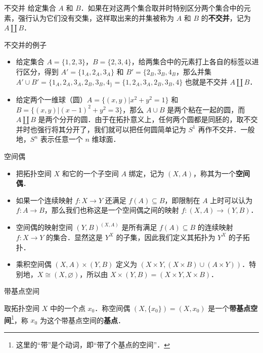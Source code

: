 

\begin{definition}{不交并}
给定集合 $A$ 和 $B$．如果在对这两个集合取并时特别区分两个集合中的元素，强行认为它们没有交集，这样取出来的并集被称为 $A$ 和 $B$ 的\textbf{不交并}，记为 $A\amalg B$．
\end{definition}

\begin{example}{不交并的例子}
\begin{itemize}
\item 给定集合 $A=\{1,2,3\}$，$B=\{2,3,4\}$，给两集合中的元素打上各自的标签以进行区分，得到 $A'=\{1_A, 2_A, 3_A\}$ 和 $B'=\{2_B, 3_B, 4_B$，那么并集 $A'\cup B'=\{1_A, 2_A, 3_A, 2_B, 3_B, 4_\}=\{1, 2_A, 3_A, 2_B, 3_B, 4\}$ 也就是不交并 $A\amalg B$．
\item 给定两个一维球（圆）$A=\{(x, y)|x^2+y^2=1\}$ 和 $B=\{(x, y)|(x-1)^2+y^2=3\}$，那么 $A\cup B$ 是两个粘在一起的圆，而 $A\amalg B$ 是两个分开的圆．由于在拓扑意义上，任何两个圆都是同胚的，取不交并时也强行将其分开了，我们就可以把任何圆简单记为 $S^1$ 再作不交并．一般地，$S^n$ 表示任意一个 $n$ 维球面．
\end{itemize}
\end{example}

\begin{definition}{空间偶}
\begin{itemize}
\item 把拓扑空间 $X$ 和它的一个子空间 $A$ 绑定，记为 $(X, A)$，称其为一个\textbf{空间偶}．
\item 如果一个连续映射 $f:X\rightarrow Y$ 还满足 $f(A)\subseteq B$，即限制在 $A$ 上时可以认为 $f:A\rightarrow B$，那么我们也称这是一个空间偶之间的映射 $f:(X, A)\rightarrow(Y, B)$．
\item 空间偶的映射空间 $(Y, B)^{(X, A)}$ 是所有满足 $f(A)\subseteq B$ 的连续映射 $f:X\rightarrow Y$ 的集合．显然这是 $Y^X$ 的子集，因此我们定义其拓扑为 $Y^X$ 的子拓扑．
\item 乘积空间偶 $(X, A)\times(Y,B)$ 定义为 $(X\times Y, (X\times B)\cup(A\times Y))$．特别地，$X\cong(X, \varnothing)$，所以由 $X\times(Y, B)=(X\times Y, X\times B)$．


\end{itemize}
\end{definition}

\begin{definition}{带基点空间}

取拓扑空间 $X$ 中的一个点 $x_0$．称空间偶 $(X, \{x_0\})=(X, x_0)$ 是一个\textbf{带基点空间}\footnote{这里的“带”是个动词，即“带了个基点的空间”．}，称 $x_0$ 为这个带基点空间的\textbf{基点}．

\end{definition}

